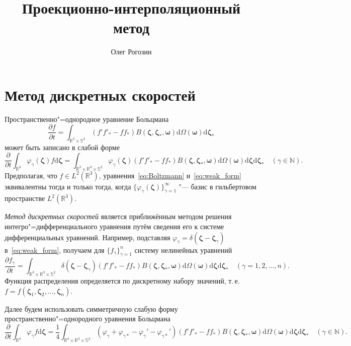 \documentclass{article}
\title{Проекционно-интерполяционный метод}
\author{Олег Рогозин}
\newcommand{\dd}{\mathrm{d}}
\newcommand{\pder}[2][]{\frac{\partial#1}{\partial#2}}
\newcommand{\dzeta}{\boldsymbol{\dd\zeta}}
\newcommand{\bzeta}{\boldsymbol{\zeta}}
\newcommand{\bomega}{\boldsymbol{\omega}}
\begin{document}
\maketitle
\tableofcontents

\section{Метод дискретных скоростей}

Пространственно"=однородное уравнение Больцмана
\begin{equation}\label{eq:Boltzmann}
    \pder[f]{t} = \int_{\mathbb{R}^3\times\mathbb{S}^2}
        (f'f'_*-ff_*)B(\bzeta,\bzeta_*,\bomega)
        \dd\Omega(\boldsymbol\omega)\dzeta_*
\end{equation}
может быть записано в слабой форме
\begin{equation}\label{eq:weak_form}
    \pder{t}\int_{\mathbb{R}^3} \varphi_\gamma(\bzeta) f\dzeta =
        \int_{\mathbb{R}^3\times\mathbb{R}^3\times\mathbb{S}^2}
        \varphi_\gamma(\bzeta) (f'f'_*-ff_*)B(\bzeta,\bzeta_*,\bomega)
        \dd\Omega(\bomega)\dzeta\dzeta_* \quad (\gamma\in\mathbb{N}).
\end{equation}
Предполагая, что \(f\in L^2(\mathbb{R}^3)\), уравнения~\eqref{eq:Boltzmann} и~\eqref{eq:weak_form} эквивалентны
тогда и только тогда, когда \(\{\varphi_\gamma(\bzeta)\}_{\gamma=1}^\infty\)
"--- базис в гильбертовом пространстве \(L^2(\mathbb{R}^3)\).

\emph{Метод дискретных скоростей} является приближённым методом решения интегро"=дифференциального уравнения
путём сведения его к системе дифференциальных уравнений.
Например, подставляя \(\varphi_\gamma = \delta(\bzeta - \bzeta_\gamma)\) в~\eqref{eq:weak_form},
получаем для \(\{f_\gamma\}_{\gamma=1}^n\) систему нелинейных уравнений
\begin{equation}\label{eq:discrete_velocities}
    \pder[f_\gamma]{t} =
        \int_{\mathbb{R}^3\times\mathbb{R}^3\times\mathbb{S}^2}
        \delta(\bzeta-\bzeta_\gamma)(f'f'_*-ff_*)B(\bzeta,\bzeta_*,\bomega)
        \dd\Omega(\bomega)\dzeta\dzeta_* \quad (\gamma=1,2,\dots,n).
\end{equation}
Функция распределения определяется по дискретному набору значений, т.\,е. \(f = f(\bzeta_1, \bzeta_2, \dots, \bzeta_n)\).

Далее будем использовать симметричную слабую форму пространственно"=однородного уравнения Больцмана
\begin{equation}\label{eq:symm_weak_form}
    \pder{t}\int_{\mathbb{R}^3} \varphi_\gamma f\dzeta =
        \frac14\int_{\mathbb{R}^3\times\mathbb{R}^3\times\mathbb{S}^2}
        \left(\varphi_\gamma+\varphi_{\gamma*}-\varphi_\gamma'-\varphi_{\gamma*}'\right)
        (f'f'_*-ff_*)B(\bzeta,\bzeta_*,\bomega)
        \dd\Omega(\bomega)\dzeta\dzeta_* \quad (\gamma\in\mathbb{N}).
\end{equation}
\end{document}
